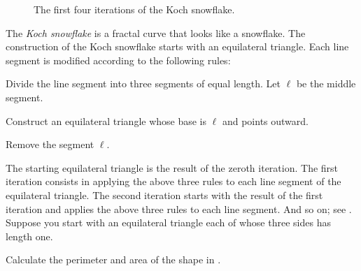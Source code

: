 \documentclass[a4paper,oneside,12pt]{article}
\begin{document}
\begin{problem}
\begin{figure}[!htbp]
{  \label{fig:Koch_snowflake_second_iteration}
}
\qquad
\caption{%
  The first four iterations of the Koch snowflake.
}
\label{fig:Koch_snowflake_first_4_iterations}
\end{figure}

\item The \emph{Koch snowflake} is a fractal curve that looks like a
  snowflake.  The construction of the Koch snowflake starts with an
  equilateral triangle.  Each line segment is modified according to
  the following rules:
  \begin{packedenumeral}
  \item Divide the line segment into three segments of equal length.
    Let $\ell$ be the middle segment.

  \item Construct an equilateral triangle whose base is $\ell$ and
    points outward.

  \item Remove the segment $\ell$.
  \end{packedenumeral}
  The starting equilateral triangle is the result of the zeroth
  iteration.  The first iteration consists in applying the above three
  rules to each line segment of the equilateral triangle.  The second
  iteration starts with the result of the first iteration and applies
  the above three rules to each line segment.  And so on; see
  .  Suppose you start
  with an equilateral triangle each of whose three sides has length
  one.
  \begin{packedenum}
  \item\label{subprob:Koch_snowflake_zeroth_iteration}
    Calculate the perimeter and area of the shape in
    .


\end{packedenum}
\end{problem}
\end{document}
